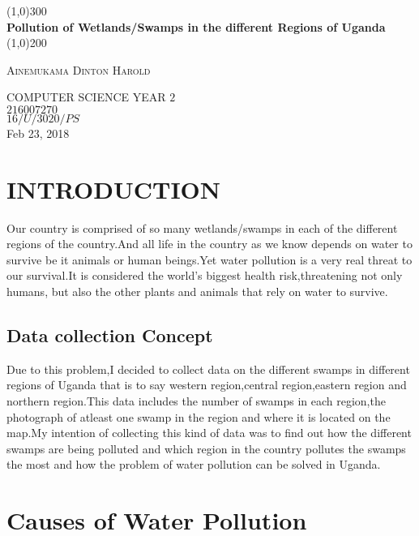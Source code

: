 \documentclass{article}
\begin{document}
\begin{titlepage}
	\begin{center}
	\line(1,0){300}\\
	[0.25in]
	\huge{\bfseries Pollution of Wetlands/Swamps in the different Regions of Uganda}\\
	[2mm]
	\line(1,0){200}\\
	\end{center}
\begin{flushright}
\textsc{\large Ainemukama Dinton Harold}
 
 COMPUTER SCIENCE YEAR $2$\\
$216007270$\\
$16/U/3020/PS$\\
Feb 23, 2018\\
\end{flushright}
	
\end{titlepage}
\tableofcontents
\thispagestyle{empty}
\cleardoublepage

\setcounter{page}{1}
\section{INTRODUCTION}
Our country is comprised of so many wetlands/swamps in each of the different regions of the country.And all life in the country as we know depends on water to survive be it animals or human beings.Yet water pollution is a very real threat to our survival.It is considered the world's biggest health risk,threatening not only humans, but also the other plants and animals that rely on water to survive.
\subsection{Data collection Concept}
Due to this problem,I decided to collect data on the different swamps in different regions of Uganda that is to say western region,central region,eastern region and northern region.This data includes the number of swamps in each region,the photograph of atleast one swamp in the region and where it is located on the map.My intention of collecting this kind of data was to find out how the different swamps are being polluted and which region in the country pollutes the swamps the most and how the problem of water pollution can be solved in Uganda.
\section{Causes of Water Pollution}
\end{document}
